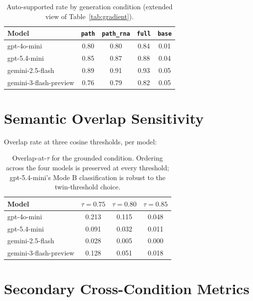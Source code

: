 \documentclass{article}
\theoremstyle{plain}
\begin{document}
\begin{table}[h]
\centering
\small
\setlength{\tabcolsep}{3pt}
\begin{tabular}{lcccc}
\toprule
\textbf{Model} & \texttt{path} & \texttt{path\_rna} & \texttt{full} & \texttt{base} \\
\midrule
gpt-4o-mini             & 0.80 & 0.80 & 0.84 & 0.01 \\
gpt-5.4-mini            & 0.85 & 0.87 & 0.88 & 0.04 \\
gemini-2.5-flash        & 0.89 & 0.91 & 0.93 & 0.05 \\
gemini-3-flash-preview  & 0.76 & 0.79 & 0.82 & 0.05 \\
\bottomrule
\end{tabular}
\caption{Auto-supported rate by generation condition (extended view of Table~\ref{tab:gradient}).}
\label{tab:gradient-app}
\end{table}

\section{Semantic Overlap Sensitivity}
\label{app:overlap-tau}

Overlap rate at three cosine thresholds, per model:

\begin{table}[h]
\centering
\small
\begin{tabular}{lccc}
\toprule
\textbf{Model} & $\tau{=}0.75$ & $\tau{=}0.80$ & $\tau{=}0.85$ \\
\midrule
gpt-4o-mini             & 0.213 & 0.115 & 0.048 \\
gpt-5.4-mini            & 0.091 & 0.032 & 0.011 \\
gemini-2.5-flash        & 0.028 & 0.005 & 0.000 \\
gemini-3-flash-preview  & 0.128 & 0.051 & 0.018 \\
\bottomrule
\end{tabular}
\caption{Overlap-at-$\tau$ for the grounded condition. Ordering across the four models is preserved at every threshold; gpt-5.4-mini's Mode B classification is robust to the twin-threshold choice.}
\label{tab:tau-sens}
\end{table}

\section{Secondary Cross-Condition Metrics}
\label{app:secondary}
\end{document}
